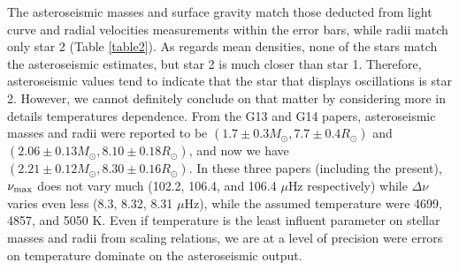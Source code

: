 

The asteroseismic masses and surface gravity match those deducted from light curve and radial velocities measurements within the error bars, while radii match only star 2 (Table \ref{table2}). As regards mean densities, none of the stars match the asteroseismic estimates, but star 2 is much closer than star 1. Therefore, asteroseismic values tend to indicate that the star that displays oscillations is star 2. However, we cannot definitely conclude on that matter by considering more in details temperatures dependence. From the G13 and G14 papers, asteroseismic masses and radii were reported to be $(1.7\pm0.3 M_\odot, 7.7\pm0.4 R_\odot)$ and $(2.06\pm0.13 M_\odot, 8.10\pm0.18 R_\odot)$, and now we have $(2.21\pm0.12 M_\odot, 8.30\pm0.16 R_\odot)$. In these three papers (including the present), $\nu_{\rm{max}}$ does not vary much (102.2, 106.4, and 106.4 $\mu$Hz respectively) while $\Delta\nu$ varies even less (8.3, 8.32, 8.31 $\mu$Hz), while the assumed temperature were 4699, 4857, and 5050 K. Even if temperature is the least influent parameter on stellar masses and radii from scaling relations, we are at a level of precision were errors on temperature dominate on the asteroseismic output. 




  
  
  
  
  
  
  
  
  
  
  
  
  
  
  
  
  
  
  
  
  
  
  
  
  
  
  
  
  
  
  
  
  
  